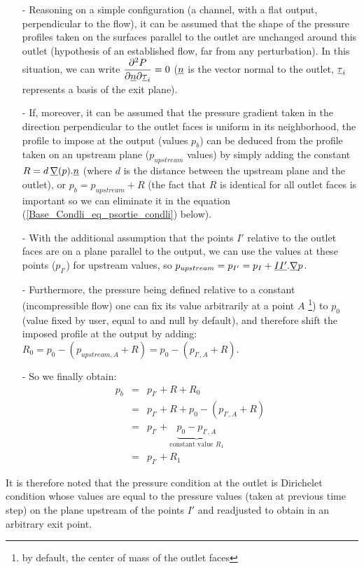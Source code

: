 \begin{itemize}
\item [-] Reasoning on a simple configuration (a channel, with a flat output,
perpendicular to the flow), it can be assumed that the shape of the pressure
profiles taken on the surfaces parallel to the outlet are unchanged around
this outlet (hypothesis of an established flow, far from any
perturbation). In this situation, we can write
$\displaystyle\frac{\partial^2P}{\partial\underline{n}\partial\underline{\tau}_i}=0$
($\underline{n}$ is the vector normal to the outlet, $\underline{\tau}_i$ represents
a basis of the exit plane).

\item [-] If, moreover,
it can be assumed that the pressure gradient taken in the direction
perpendicular to the outlet faces is uniform in its neighborhood,
the profile to impose at the output (values $p_b$) can be deduced from the profile
taken on an upstream plane ($p_{upstream}$ values) by simply adding the constant
$R=d\,\underline{\nabla}{(p)}.\underline{n}$ (where $d$ is the distance between the upstream plane
and the outlet), or $p_b=p_{upstream}+R$ (the fact that $R$ is identical for
all outlet faces is important so we can eliminate it in the equation
(\ref{Base_Condli_eq_psortie_condli}) below).

\item [-] With the additional assumption that the points $I'$ relative to
the outlet faces are on a plane parallel to the output, we can use the
values at these points ($p_{I'}$) for upstream values, so
$p_{upstream}=p_{I'}=p_{I}+\underline{II'}.\underline{\nabla}{p}$.

\item [-] Furthermore, the
pressure being defined relative to a constant (incompressible flow)
one can fix its value arbitrarily at a point $A$
\footnote{by default, the center of mass of the outlet faces}) to $p_0$ (value fixed by
user, equal to  and null by default),
and therefore shift the imposed profile at the output by adding:\\
$R_0=p_0-(p_{upstream,A}+R)=p_0-(p_{I',A}+R)$.

\item [-] So we finally obtain:
\begin{equation}\label{Base_Condli_eq_psortie_condli}
\begin{array}{lll}
p_b&=&p_{I'}+R+R_0\\
   &=&p_{I'}+R+p_0-(p_{I',A}+R)\\
   &=&p_{I'}+\underbrace{p_0-p_{I',A}}_{\text{constant value $R_1$}}\\
   &=&p_{I'}+R_1
\end{array}
\end{equation}
\end{itemize}
It is therefore noted that the pressure condition at the outlet is Dirichelet condition
whose values are equal to the pressure values (taken at previous time step) on
the plane upstream of the points $I'$ and readjusted to obtain  in
an arbitrary exit point.

